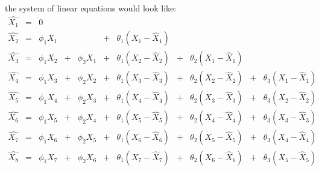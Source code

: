 the system of linear equations would look like:
\begin{equation}\label{eq:ARMA_hat_2_3_big}
	\begin{array}{lcccccccccc}
	
        \hat{X_1} &=& 0 &&&&&&&&\\
        \hat{X_2} &=& \phi_1 X_{1} &&&+& \theta_1 (X_{1}-\hat{X}_{1}) &&&& \\
        \hat{X_3} &=& \phi_1 X_{2} &+& \phi_2 X_{1} &+& \theta_1 (X_{2}-\hat{X}_{2}) &+& \theta_2  (X_{1}-\hat{X}_{1})&&\\
        \hat{X_4} &=& \phi_1 X_{3} &+& \phi_2 X_{2} &+& \theta_1 (X_{3}-\hat{X}_{3}) &+& \theta_2  (X_{2}-\hat{X}_{2})&+& \theta_3  (X_{1}-\hat{X}_{1}) \\
        \hat{X_5} &=& \phi_1 X_{4} &+& \phi_2 X_{3} &+& \theta_1 (X_{4}-\hat{X}_{4}) &+& \theta_2  (X_{3}-\hat{X}_{3})&+& \theta_3  (X_{2}-\hat{X}_{2}) \\
        \hat{X_6} &=& \phi_1 X_{5} &+& \phi_2 X_{4} &+& \theta_1 (X_{5}-\hat{X}_{5}) &+& \theta_2  (X_{4}-\hat{X}_{4})&+& \theta_3  (X_{3}-\hat{X}_{3}) \\
        \hat{X_7} &=& \phi_1 X_{6} &+& \phi_2 X_{5} &+& \theta_1 (X_{6}-\hat{X}_{6}) &+& \theta_2  (X_{5}-\hat{X}_{5})&+& \theta_3  (X_{4}-\hat{X}_{4}) \\
        \hat{X_8} &=& \phi_1 X_{7} &+& \phi_2 X_{6} &+& \theta_1 (X_{7}-\hat{X}_{7}) &+& \theta_2  (X_{6}-\hat{X}_{6})&+& \theta_3  (X_{5}-\hat{X}_{5})
    \end{array}
\end{equation}

